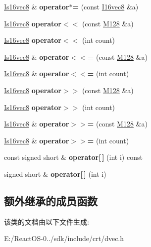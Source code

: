 \begin{DoxyCompactItemize}
\hyperlink{class_is16vec8}{Is16vec8} \& {\bfseries operator$\ast$=} (const \hyperlink{class_i16vec8}{I16vec8} \&a)
\item 
\mbox{\label{class_is16vec8_aff4081bb7d3c5914015c8585869ffd63}} 
\hyperlink{class_is16vec8}{Is16vec8} {\bfseries operator$<$$<$} (const \hyperlink{class_m128}{M128} \&a)
\item 
\mbox{\label{class_is16vec8_adfd7a5c8bd1041e73a022e0811970318}} 
\hyperlink{class_is16vec8}{Is16vec8} {\bfseries operator$<$$<$} (int count)
\item 
\mbox{\label{class_is16vec8_a0cb5361af63c24c22ef4e640abae79cb}} 
\hyperlink{class_is16vec8}{Is16vec8} \& {\bfseries operator$<$$<$=} (const \hyperlink{class_m128}{M128} \&a)
\item 
\mbox{\label{class_is16vec8_a1ee41130fbdc4d33bec3a4aadfddfd10}} 
\hyperlink{class_is16vec8}{Is16vec8} \& {\bfseries operator$<$$<$=} (int count)
\item 
\mbox{\label{class_is16vec8_a24714ebdba764a982c55957675b93586}} 
\hyperlink{class_is16vec8}{Is16vec8} {\bfseries operator$>$$>$} (const \hyperlink{class_m128}{M128} \&a)
\item 
\mbox{\label{class_is16vec8_adebbb5bd0285554705b96c2fb6218b06}} 
\hyperlink{class_is16vec8}{Is16vec8} {\bfseries operator$>$$>$} (int count)
\item 
\mbox{\label{class_is16vec8_affe4e5b9f320bd86b00fe74df770395b}} 
\hyperlink{class_is16vec8}{Is16vec8} \& {\bfseries operator$>$$>$=} (const \hyperlink{class_m128}{M128} \&a)
\item 
\mbox{\label{class_is16vec8_a650586295a4f0dab8e03fa45b7f10392}} 
\hyperlink{class_is16vec8}{Is16vec8} \& {\bfseries operator$>$$>$=} (int count)
\item 
\mbox{\label{class_is16vec8_a1d3ec2791e8fb70d1e8ec083c4b25439}} 
const signed short \& {\bfseries operator\mbox{[}$\,$\mbox{]}} (int i) const
\item 
\mbox{\label{class_is16vec8_a9834d1957dfea1098569f77f81a302af}} 
signed short \& {\bfseries operator\mbox{[}$\,$\mbox{]}} (int i)
\end{DoxyCompactItemize}
\subsection*{额外继承的成员函数}


该类的文档由以下文件生成\+:\begin{DoxyCompactItemize}
\item 
E\+:/\+React\+O\+S-\/0../sdk/include/crt/dvec.\+h\end{DoxyCompactItemize}

